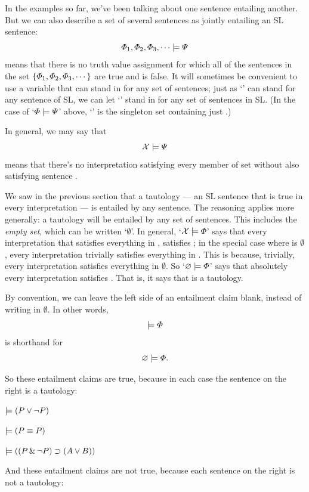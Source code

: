 In the examples so far, we've been talking about one sentence entailing another. But we can also describe a set of several sentences as jointly entailing an SL sentence: $$\varPhi{}_1,\varPhi{}_2,\varPhi{}_3,\cdots\models\varPsi{}$$ means that there is no truth value assignment for which all of the sentences in the set $\{\varPhi{}_1,\varPhi{}_2,\varPhi{}_3,\cdots\}$ are true and \metaB{} is false. It will sometimes be convenient to use a variable that can stand in for any set of sentences; just as `\metaA{}' can stand for any sentence of SL, we can let `\metaSetX{}' stand in for any set of sentences in SL. (In the case of `$\varPhi{}\models\varPsi{}$' above, `\metaSetX{}' is the singleton set containing just \metaA{}.)

In general, we may say that $$\mathcal{X}{}\models\varPsi{}$$ means that there's no interpretation satisfying every member of set \metaSetX{} without also satisfying sentence \metaB{}.

We saw in the previous section that a tautology ---  an SL sentence that is true in every interpretation --- is entailed by any sentence. The reasoning applies more generally: a tautology will be entailed by any set of sentences. This includes the \emph{empty set}, which can be written `$\emptyset$'. In general, `$\mathcal{X}{} \models \varPhi{}$' says that every interpretation that satisfies everything in \metaSetX{}, satisfies \metaA{}; in the special case where \metaSetX{} is $\emptyset$, every interpretation trivially satisfies everything in \metaSetX{}. This is because, trivially, every interpretation satisfies everything in $\emptyset$. So `$\varnothing \models \varPhi{}$' says that absolutely every interpretation satisfies \metaA{}. That is, it says that \metaA{} is a tautology.

By convention, we can leave the left side of an entailment claim blank, instead of writing in $\emptyset$. In other words, $$\models \varPhi{} $$ is shorthand for $$ \varnothing \models \varPhi{}.$$

So these entailment claims are true, because in each case the sentence on the right is a tautology:

\begin{earg}
\item[] $\models (P \vee \neg P)$
\item[] $\models (P \equiv P)$
\item[] $\models ((P \,\&\,\neg P)\supset (A \vee B))$
\end{earg}

And these entailment claims are not true, because each sentence on the right is not a tautology:

